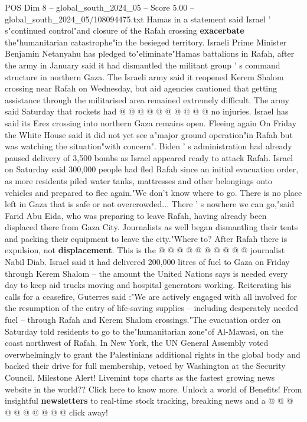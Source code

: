 \begin{textsample}{POS Dim 8 – global\_south\_2024\_05 – Score 5.00 – global\_south\_2024\_05/108094475.txt}
Hamas in a statement said Israel ' s"continued control"and closure of the Rafah crossing \textbf{exacerbate} the"humanitarian catastrophe"in the besieged territory.
Israeli Prime Minister Benjamin Netanyahu has pledged to"eliminate"Hamas battalions in Rafah, after the army in January said it had dismantled the militant group ' s command structure in northern Gaza.
The Israeli army said it reopened Kerem Shalom crossing near Rafah on Wednesday, but aid agencies cautioned that getting assistance through the militarised area remained extremely difficult.
The army said Saturday that rockets had @ @ @ @ @ @ @ @ @ @ no injuries.
Israel has said its Erez crossing into northern Gaza remains open.
Fleeing again On Friday the White House said it did not yet see a"major ground operation"in Rafah but was watching the situation"with concern".
Biden ' s administration had already paused delivery of 3,500 bombs as Israel appeared ready to attack Rafah.
Israel on Saturday said 300,000 people had fled Rafah since an initial evacuation order, as more residents piled water tanks, mattresses and other belongings onto vehicles and prepared to flee again."We don't know where to go.
There is no place left in Gaza that is safe or not overcrowded...
There ' s nowhere we can go,"said Farid Abu Eida, who was preparing to leave Rafah, having already been displaced there from Gaza City.
Journalists as well began dismantling their tents and packing their equipment to leave the city."Where to?
After Rafah there is expulsion, not \textbf{displacement}.
This is the @ @ @ @ @ @ @ @ @ @ journalist Nabil Diab.
Israel said it had delivered 200,000 litres of fuel to Gaza on Friday through Kerem Shalom -- the amount the United Nations says is needed every day to keep aid trucks moving and hospital generators working.
Reiterating his calls for a ceasefire, Guterres said :"We are actively engaged with all involved for the resumption of the entry of life-saving supplies -- including desperately needed fuel -- through Rafah and Kerem Shalom crossings."The evacuation order on Saturday told residents to go to the"humanitarian zone"of Al-Mawasi, on the coast northwest of Rafah.
In New York, the UN General Assembly voted overwhelmingly to grant the Palestinians additional rights in the global body and backed their drive for full membership, vetoed by Washington at the Security Council.
Milestone Alert!
Livemint tops charts as the fastest growing news website in the world??
Click here to know more.
Unlock a world of Benefits!
From insightful \textbf{newsletters} to real-time stock tracking, breaking news and a @ @ @ @ @ @ @ @ @ @ click away!

\end{textsample}
